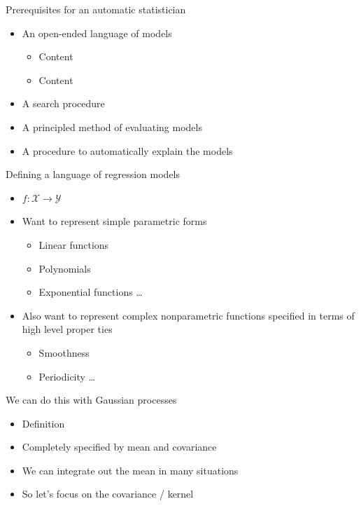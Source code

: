 \begin{frame}{Prerequisites for an automatic statistician}
  \begin{itemize}
    \item An open-ended language of models
    \begin{itemize}
       \item Content
       \item Content
     \end{itemize}
    \vspace{\baselineskip}
    \item A search procedure
    \vspace{\baselineskip}
    \item A principled method of evaluating models
    \vspace{\baselineskip}
    \item A procedure to automatically explain the models
  \end{itemize}
\end{frame}

\begin{frame}{Defining a language of regression models}
  \begin{itemize}
    \item $f: \mathcal{X} \to \mathcal{Y}$
    \vspace{\baselineskip}
    \item Want to represent simple parametric forms
    \begin{itemize}
       \item Linear functions
       \item Polynomials
       \item Exponential functions \ldots
     \end{itemize}
    \vspace{\baselineskip}
    \item Also want to represent complex nonparametric functions specified in terms of high level proper ties
    \begin{itemize}
       \item Smoothness
       \item Periodicity \ldots
     \end{itemize}
  \end{itemize}
\end{frame}

\begin{frame}{We can do this with Gaussian processes}
  \begin{itemize}
    \item Definition
    \vspace{\baselineskip}
    \item Completely specified by mean and covariance
    \vspace{\baselineskip}
    \item We can integrate out the mean in many situations
    \vspace{\baselineskip}
    \item So let's focus on the covariance / kernel
  \end{itemize}
\end{frame}

